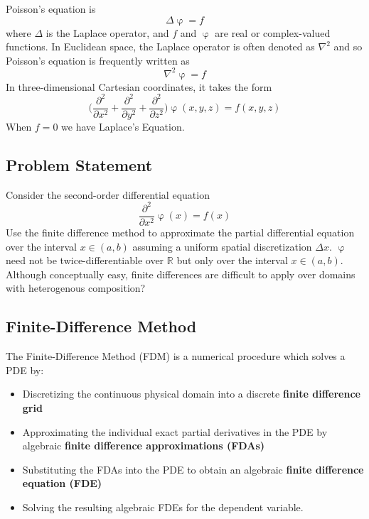 \documentclass[../main.tex]{subfiles}
\begin{document}
Poisson's equation is
\begin{equation}\label{eq:Poisson}
\Delta\upvarphi=f
\end{equation}
where $\Delta$ is the Laplace operator, and $f$ and $\upvarphi$ are real or complex-valued functions. In Euclidean space, the Laplace operator is often denoted as $\nabla^2$ and so Poisson's equation is frequently written as
\begin{equation}\label{eq:Poisson2}
\nabla^2\upvarphi=f
\end{equation}
In three-dimensional Cartesian coordinates, it takes the form
\begin{equation}\label{eq:Poisson3}
\Big(\frac{\partial^2}{\partial x^2} + \frac{\partial^2}{\partial y^2}+\frac{\partial^2}{\partial z^2}\Big)\upvarphi(x,y,z) = f(x,y,z)
\end{equation}
When $f=0$ we have Laplace's Equation.

\subsection{Problem Statement}
Consider the second-order differential equation
\begin{equation}\label{eq:ProblemStatement}
\frac{\partial^2}{\partial x^2}\upvarphi(x) = f(x)
\end{equation}
Use the finite difference method to approximate the partial differential equation over the interval $x\in(a,b)$ assuming a uniform spatial discretization $\Delta x$. $\upvarphi$ need not be twice-differentiable over $\mathbb{R}$ but only over the interval $x\in(a,b)$. \color{red}Although conceptually easy, finite differences are difficult to apply over domains with heterogenous composition?
\color{black}

\subsection{Finite-Difference Method}
The Finite-Difference Method (FDM) is a numerical procedure which solves a PDE by:
\begin{itemize}
	\item Discretizing the continuous physical domain into a discrete \textbf{finite difference grid}
    \item Approximating the individual exact partial derivatives in the PDE by algebraic \textbf{finite difference approximations (FDAs)}
    \item Substituting the FDAs into the PDE to obtain an algebraic \textbf{finite difference equation (FDE)}
    \item Solving the resulting algebraic FDEs for the dependent variable.
\end{itemize}
\end{document}

